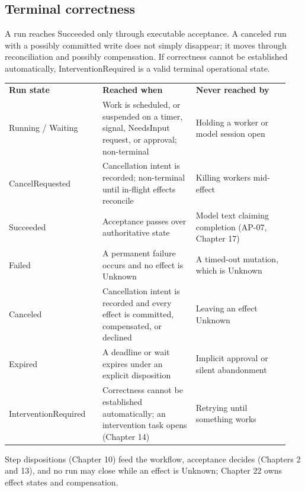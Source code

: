 \subsection{Terminal correctness}

A run reaches Succeeded only through executable acceptance. A canceled run with a possibly committed write does not simply disappear; it moves through reconciliation and possibly compensation. If correctness cannot be established automatically, InterventionRequired is a valid terminal operational state.\par

\BookTableStart
\small
\begin{tabular}{@{}Y{0.3133\linewidth}Y{0.3133\linewidth}Y{0.3133\linewidth}@{}}
\color{white}\bfseries \textbf{Run state} & \color{white}\bfseries \textbf{Reached when} & \color{white}\bfseries \textbf{Never reached by} \\
Running / Waiting & Work is scheduled, or suspended on a timer, signal, NeedsInput request, or approval; non-terminal & Holding a worker or model session open \\
CancelRequested & Cancellation intent is recorded; non-terminal until in-flight effects reconcile & Killing workers mid-effect \\
Succeeded & Acceptance passes over authoritative state & Model text claiming completion (AP-07, Chapter 17) \\
Failed & A permanent failure occurs and no effect is Unknown & A timed-out mutation, which is Unknown \\
Canceled & Cancellation intent is recorded and every effect is committed, compensated, or declined & Leaving an effect Unknown \\
Expired & A deadline or wait expires under an explicit disposition & Implicit approval or silent abandonment \\
InterventionRequired & Correctness cannot be established automatically; an intervention task opens (Chapter 14) & Retrying until something works \\
\end{tabular}
\BookTableEnd

Step dispositions (Chapter 10) feed the workflow, acceptance decides (Chapters 2 and 13), and no run may close while an effect is Unknown; Chapter 22 owns effect states and compensation.\par

